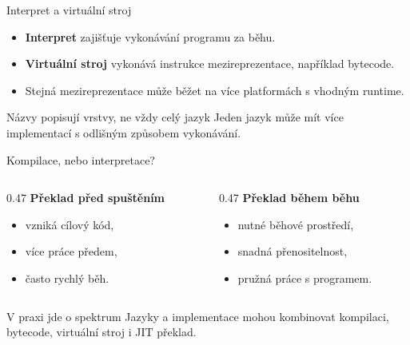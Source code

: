 \documentclass[aspectratio=169]{beamer}
\newcommand{\term}[1]{\textcolor{CodeBlue}{\textbf{#1}}}
\begin{document}
\begin{frame}{Interpret a virtuální stroj}
  \begin{itemize}
    \item \term{Interpret} zajišťuje vykonávání programu za běhu.
    \item \term{Virtuální stroj} vykonává instrukce mezireprezentace, například bytecode.
    \item Stejná mezireprezentace může běžet na více platformách s vhodným runtime.
  \end{itemize}
  \begin{block}{Názvy popisují vrstvy, ne vždy celý jazyk}
    Jeden jazyk může mít více implementací s odlišným způsobem vykonávání.
  \end{block}
\end{frame}

\begin{frame}{Kompilace, nebo interpretace?}
  \begin{columns}[T]
    \begin{column}{0.47\textwidth}
      \textbf{Překlad před spuštěním}
      \begin{itemize}
        \item vzniká cílový kód,
        \item více práce předem,
        \item často rychlý běh.
      \end{itemize}
    \end{column}
    \begin{column}{0.47\textwidth}
      \textbf{Překlad během běhu}
      \begin{itemize}
        \item nutné běhové prostředí,
        \item snadná přenositelnost,
        \item pružná práce s programem.
      \end{itemize}
    \end{column}
  \end{columns}
  \vspace{0.5cm}
  \begin{block}{V praxi jde o spektrum}
    Jazyky a implementace mohou kombinovat kompilaci, bytecode, virtuální stroj i JIT překlad.
  \end{block}
\end{frame}
\end{document}
